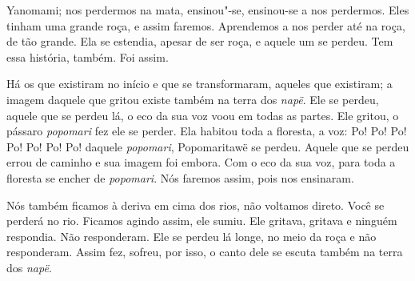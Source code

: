  

 Yanomami; nos perdermos na mata, ensinou"-se,
ensinou-se a nos perdermos. Eles tinham uma grande roça, e assim faremos.
Aprendemos a nos perder até na roça, de tão grande. Ela se estendia, apesar
de ser roça, e aquele um se perdeu. Tem essa história, também. Foi assim. 

Há os que existiram no início e que se transformaram, aqueles que
existiram; a imagem daquele que gritou existe também na terra
dos \emph{napë}. Ele se perdeu, aquele que se perdeu lá, o eco da sua
voz voou em todas as partes. Ele gritou, o pássaro \emph{popomari} fez
ele se perder. Ela habitou toda a floresta, a voz: Po! Po! Po! Po! Po!
Po! Po! daquele \emph{popomari}, Popomaritawë se perdeu. Aquele que se
perdeu errou de caminho e sua imagem foi embora. Com o eco da sua voz,
para toda a floresta se encher de \emph{popomari}. Nós faremos assim,
pois nos ensinaram. 

Nós também ficamos à deriva em cima dos rios, não voltamos direto. Você se
perderá no rio. Ficamos agindo assim, ele sumiu. Ele gritava, gritava e
ninguém respondia. Não responderam. Ele se perdeu lá longe, no meio da
roça e não responderam. Assim fez, sofreu, por isso, o canto dele se
escuta também na terra dos \emph{napë}.